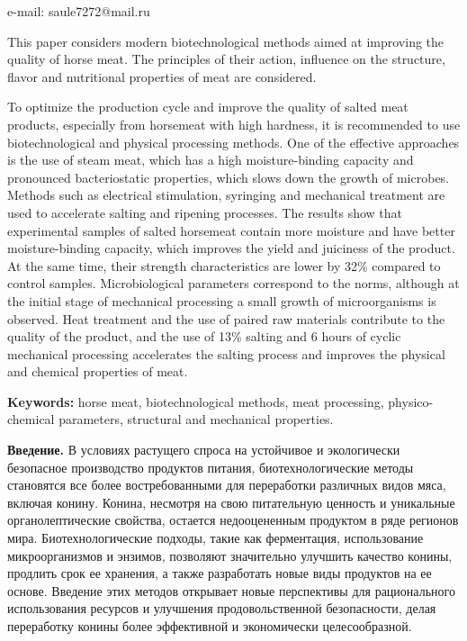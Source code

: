 e-mail: saule7272@mail.ru

This paper considers modern biotechnological methods aimed at improving
the quality of horse meat. The principles of their action, influence on
the structure, flavor and nutritional properties of meat are considered.

To optimize the production cycle and improve the quality of salted meat
products, especially from horsemeat with high hardness, it is
recommended to use biotechnological and physical processing methods. One
of the effective approaches is the use of steam meat, which has a high
moisture-binding capacity and pronounced bacteriostatic properties,
which slows down the growth of microbes. Methods such as electrical
stimulation, syringing and mechanical treatment are used to accelerate
salting and ripening processes. The results show that experimental
samples of salted horsemeat contain more moisture and have better
moisture-binding capacity, which improves the yield and juiciness of the
product. At the same time, their strength characteristics are lower by
32\% compared to control samples. Microbiological parameters correspond
to the norms, although at the initial stage of mechanical processing a
small growth of microorganisms is observed. Heat treatment and the use
of paired raw materials contribute to the quality of the product, and
the use of 13\% salting and 6 hours of cyclic mechanical processing
accelerates the salting process and improves the physical and chemical
properties of meat.

{\bfseries Keywords:} horse meat, biotechnological methods, meat
processing, physico-chemical parameters, structural and mechanical
properties.

{\bfseries Введение.} В условиях растущего спроса на устойчивое и
экологически безопасное производство продуктов питания,
биотехнологические методы становятся все более востребованными для
переработки различных видов мяса, включая конину. Конина, несмотря на
свою питательную ценность и уникальные органолептические свойства,
остается недооцененным продуктом в ряде регионов мира.
Биотехнологические подходы, такие как ферментация, использование
микроорганизмов и энзимов, позволяют значительно улучшить качество
конины, продлить срок ее хранения, а также разработать новые виды
продуктов на ее основе. Введение этих методов открывает новые
перспективы для рационального использования ресурсов и улучшения
продовольственной безопасности, делая переработку конины более
эффективной и экономически целесообразной.

